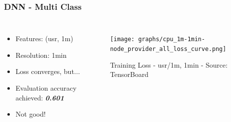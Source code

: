 \documentclass[aspectratio=169,11pt,hyperref={colorlinks=true}]{beamer}
\begin{document}
\begin{frame}
    \frametitle{DNN - Multi Class}
    \begin{columns}
        \begin{itemize}
          \item{Features: (usr, 1m)}
          \item{Resolution: 1min}
          \item{Loss converges, but...}
          \item{Evaluation accuracy achieved: \emph{\textbf{0.601}}}
          \item{Not good!}
        \end{itemize}
        \begin{figure}
          \begin{center}
            \texttt{[image: graphs/cpu\_1m-1min-node\_provider\_all\_loss\_curve.png]}
              \caption{Training Loss - usr/1m, 1min - Source: TensorBoard}
          \end{center}
        \end{figure}
      \end{columns}
\end{frame}
\end{document}
